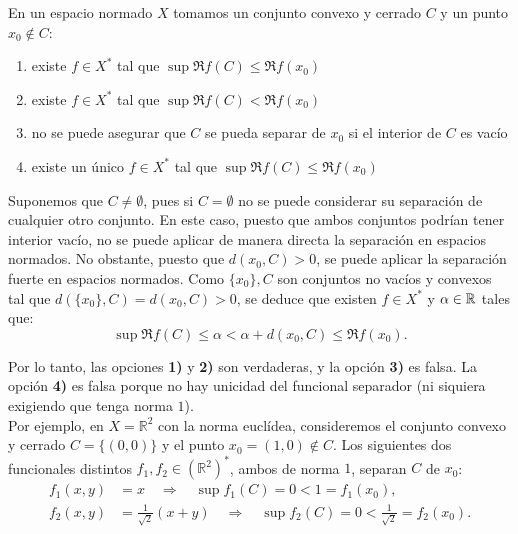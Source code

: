 \documentclass[12pt]{article}
\begin{document}
\begin{ejercicio}
    En un espacio normado $X$ tomamos un conjunto convexo y cerrado $C$ y un punto $x_0 \notin C$:
    \begin{enumerate}[label={\arabic*)}]
        \item existe $f \in X^*$ tal que $\sup \Re f(C) \leq \Re f(x_0)$
        \item existe $f \in X^*$ tal que $\sup \Re f(C) < \Re f(x_0)$
        \item no se puede asegurar que $C$ se pueda separar de $x_0$ si el interior de $C$ es vacío
        \item existe un único $f \in X^*$ tal que $\sup \Re f(C) \leq \Re f(x_0)$
    \end{enumerate}

    Suponemos que $C\neq \emptyset$, pues si $C=\emptyset$ no se puede considerar su separación de cualquier otro conjunto. En este caso, puesto que ambos conjuntos podrían tener interior vacío, no se puede aplicar de manera directa la separación en espacios normados. No obstante, puesto que $d(x_0, C) > 0$, se puede aplicar la separación fuerte en espacios normados. Como $\{x_0\},C$ son conjuntos no vacíos y convexos tal que $d(\{x_0\}, C) = d(x_0, C) > 0$, se deduce que existen $f \in X^*$ y $\alpha \in \mathbb{R}$ tales que:
    \begin{equation*}
        \sup \Re f(C) \leq  \alpha<\alpha + d(x_0, C) \leq \Re f(x_0).
    \end{equation*}

    Por lo tanto, las opciones \textbf{1)} y \textbf{2)} son verdaderas, y la opción \textbf{3)} es falsa. La opción \textbf{4)} es falsa porque no hay unicidad del funcional separador (ni siquiera exigiendo que tenga norma $1$).\\

    Por ejemplo, en $X = \mathbb{R}^2$ con la norma euclídea, consideremos el conjunto convexo y cerrado $C = \{(0,0)\}$ y el punto $x_0 = (1,0) \notin C$. Los siguientes dos funcionales distintos $f_1, f_2 \in (\mathbb{R}^2)^*$, ambos de norma $1$, separan $C$ de $x_0$:
    \begin{align*}
        f_1(x,y) &= x \quad \Longrightarrow \quad \sup f_1(C) = 0 < 1 = f_1(x_0), \\
        f_2(x,y) &= \frac{1}{\sqrt{2}}(x+y) \quad \Longrightarrow \quad \sup f_2(C) = 0 < \frac{1}{\sqrt{2}} = f_2(x_0).
    \end{align*}
\end{ejercicio}
\end{document}
